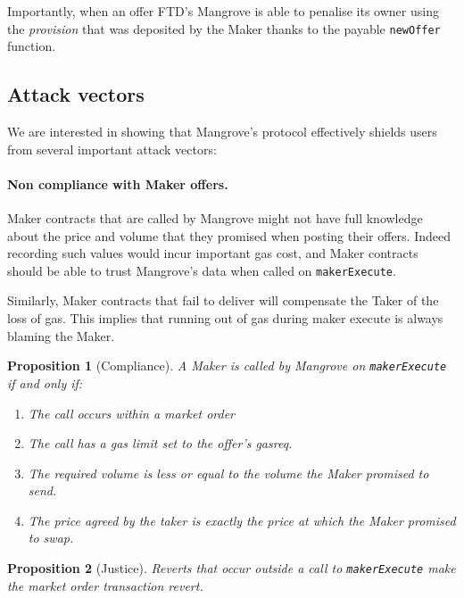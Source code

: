 \documentclass[12pt]{extarticle}
\newtheorem{proposition}{Proposition}
\begin{document}
Importantly, when an offer FTD's Mangrove is able to penalise its owner using the \emph{provision} that was deposited by the Maker thanks to the payable \texttt{newOffer} function.

\subsection{Attack vectors}\label{sec:attacks}

We are interested in showing that Mangrove's protocol effectively shields users from several important attack vectors:

\paragraph{Non compliance with Maker offers.}
Maker contracts that are called by Mangrove might not have full knowledge about the price and volume that they promised when posting their offers. Indeed recording such values would incur important gas cost, and Maker contracts should be able to trust Mangrove's data when called on \texttt{makerExecute}. 

Similarly, Maker contracts that fail to deliver will compensate the Taker of the loss of gas. This implies that running out of gas during maker execute is always blaming the Maker. 

\begin{proposition}[Compliance]
A Maker is called by Mangrove on {\rm\texttt{maker\-Execute}} if and only if:
\begin{enumerate}
\item The call occurs within a market order
\item The call has a gas limit set to the offer's \emph{gasreq}.
\item The required volume is less or equal to the volume the Maker promised to send.
\item The price agreed by the taker is exactly the price at which the Maker promised to swap. 
\end{enumerate}
\end{proposition}

\begin{proposition}[Justice]
Reverts that occur outside a call to {\rm\texttt{makerExecute}} make the market order transaction revert.
\end{proposition}
\end{document}

